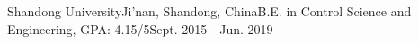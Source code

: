 \begin{rSubsection}
{Shandong University}{Ji'nan, Shandong, China}{B.E. in Control Science and Engineering, GPA: 4.15/5}{Sept. 2015 - Jun. 2019}
\end{rSubsection}
\vspace{0.1cm}
